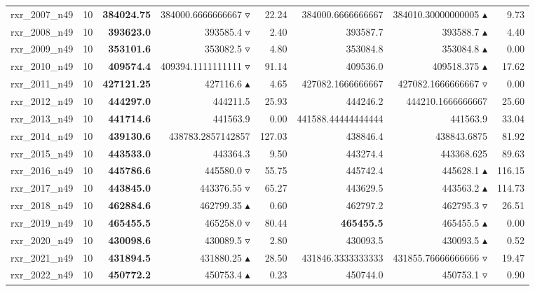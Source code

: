 \begin{table}[]
{\begin{tabular}{ll@{\hspace{1.2cm}}rrr@{\hspace{1.2cm}}rrr}
rxr_2007_n49 & 10 & \textbf{384024.75} & 384000.6666666667 $\triangledown$ & 22.24 & 384000.6666666667 & 384010.30000000005 $\blacktriangle$ & 9.73 \\
rxr_2008_n49 & 10 & \textbf{393623.0} & 393585.4 $\triangledown$ & 2.40 & 393587.7 & 393588.7 $\blacktriangle$ & 4.40 \\
rxr_2009_n49 & 10 & \textbf{353101.6} & 353082.5 $\triangledown$ & 4.80 & 353084.8 & 353084.8 $\blacktriangle$ & 0.00 \\
rxr_2010_n49 & 10 & \textbf{409574.4} & 409394.1111111111 $\triangledown$ & 91.14 & 409536.0 & 409518.375 $\blacktriangle$ & 17.62 \\
rxr_2011_n49 & 10 & \textbf{427121.25} & 427116.6 $\blacktriangle$ & 4.65 & 427082.1666666667 & 427082.1666666667 $\triangledown$ & 0.00 \\
rxr_2012_n49 & 10 & \textbf{444297.0} & 444211.5 \phantom{$\blacktriangle$} & 25.93 & 444246.2 & 444210.1666666667 \phantom{$\blacktriangle$} & 25.60 \\
rxr_2013_n49 & 10 & \textbf{441714.6} & 441563.9 \phantom{$\blacktriangle$} & 0.00 & 441588.44444444444 & 441563.9 \phantom{$\blacktriangle$} & 33.04 \\
rxr_2014_n49 & 10 & \textbf{439130.6} & 438783.2857142857 \phantom{$\blacktriangle$} & 127.03 & 438846.4 & 438843.6875 \phantom{$\blacktriangle$} & 81.92 \\
rxr_2015_n49 & 10 & \textbf{443533.0} & 443364.3 \phantom{$\blacktriangle$} & 9.50 & 443274.4 & 443368.625 \phantom{$\blacktriangle$} & 89.63 \\
rxr_2016_n49 & 10 & \textbf{445786.6} & 445580.0 $\triangledown$ & 55.75 & 445742.4 & 445628.1 $\blacktriangle$ & 116.15 \\
rxr_2017_n49 & 10 & \textbf{443845.0} & 443376.55 $\triangledown$ & 65.27 & 443629.5 & 443563.2 $\blacktriangle$ & 114.73 \\
rxr_2018_n49 & 10 & \textbf{462884.6} & 462799.35 $\blacktriangle$ & 0.60 & 462797.2 & 462795.3 $\triangledown$ & 26.51 \\
rxr_2019_n49 & 10 & \textbf{465455.5} & 465258.0 $\triangledown$ & 80.44 & \textbf{465455.5} & 465455.5 $\blacktriangle$ & 0.00 \\
rxr_2020_n49 & 10 & \textbf{430098.6} & 430089.5 $\triangledown$ & 2.80 & 430093.5 & 430093.5 $\blacktriangle$ & 0.52 \\
rxr_2021_n49 & 10 & \textbf{431894.5} & 431880.25 $\blacktriangle$ & 28.50 & 431846.3333333333 & 431855.76666666666 $\triangledown$ & 19.47 \\
rxr_2022_n49 & 10 & \textbf{450772.2} & 450753.4 $\blacktriangle$ & 0.23 & 450744.0 & 450753.1 $\triangledown$ & 0.90 \\
\bottomrule
    \end{tabular}
    }
\end{table}
